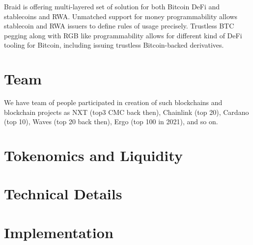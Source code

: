 \documentclass{llncs}   %
\newcommand{\authnote}[2]{\marginpar{\parbox{\marginparwidth}{\tiny %
  \textsf{#1 {\textcolor{blue}{notes: #2}}}}}%
  \textcolor{blue}{\textbf{\dag}}}
\newcommand{\authnote}[2]{
  \textsf{#1 \textcolor{blue}{: #2}}}
\newcommand{\authnote}[2]{}
\newcommand{\knote}[1]{{\authnote{\textcolor{green}{kushti notes}}{#1}}}
\newcommand{\bc}{Braid}
\begin{document}
\bc{} is offering multi-layered set of solution for both Bitcoin DeFi and stablecoins and RWA. Unmatched support for money programmability allows stablecoin and RWA issuers to define rules of usage precisely. Trustless BTC pegging along with RGB like programmability allows for different kind of DeFi tooling for Bitcoin, including issuing trustless Bitcoin-backed derivatives. 


\section{Team}
\label{sec-team}

We have team of people participated in creation of such blockchains and blockchain projects as NXT (top3 CMC back then), Chainlink (top 20),
 Cardano (top 10), Waves (top 20 back then), Ergo (top 100 in 2021), and so on.


\section{Tokenomics and Liquidity}
\label{sec-tokenomics}

\knote{to be decided later}



\section{Technical Details}
\label{sec-techdetails}





\section{Implementation}
\label{sec-apps}



\newpage

 
\end{document}
